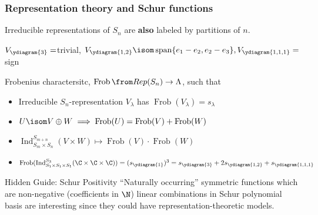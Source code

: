\documentclass[dvipsnames]{beamer}
\renewcommand{\Span}{\operatorname{span}}
\DeclareMathOperator{\Ind}{Ind}
\theoremstyle{definition}
\newcounter{c}
\begin{document}
\begin{frame}
  \frametitle{Representation theory and Schur functions}
 Irreducible representations of \(S_n\) are \textbf{also} labeled by
      partitions of \(n\). \pause 
      \begin{center}
        \(V_{\ydiagram{3}} = \)trivial,
        \(V_{\ydiagram{1,2}} \isom \Span\{e_1-e_2, e_2-e_3\},
        V_{\ydiagram{1,1,1}} = \)sign
      \end{center}\pause
  Frobenius charactersitc, \(\operatorname{Frob}\from Rep(S_n) \to
  \Lambda\), such that \pause
    \begin{itemize}
    \item Irreducible \(S_n\)-representation \(V_\lambda\) has 
      \(\operatorname{Frob}(V_\lambda) = s_\lambda\) \pause
    \item \(U \isom V \oplus W \implies \operatorname{Frob}(U) = \operatorname{Frob}(V)+\operatorname{Frob}(W)\)\pause
    \item \(\Ind_{S_m \times S_n}^{S_{m+n}} (V \times W) \mapsto
      \operatorname{Frob}(V) \cdot \operatorname{Frob}(W)\) \pause
    \item \(\operatorname{Frob}( \Ind_{S_1 \times S_1 \times S_1}^{S_3} (\C \times \C
    \times \C) ) = (s_{\ydiagram{1}})^3 = s_{\ydiagram{3}} + 2 s_{\ydiagram{1,2}} + s_{\ydiagram{1,1,1}}\)\pause
    \end{itemize}
  \begin{block}{Hidden Guide: Schur Positivity}
    ``Naturally occurring'' symmetric functions which are non-negative
    (coefficients in \(\N\))
    linear combinations in Schur polynomial basis
     are interesting since they could have representation-theoretic models.
  \end{block}
\end{frame}
\end{document}
